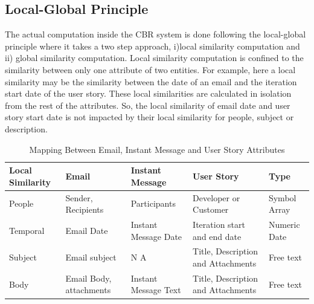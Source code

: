 \subsection{Local-Global Principle}

The actual computation inside the CBR system is done following the local-global principle\cite{local_global} where it takes a two step approach, i)local similarity computation and ii) global similarity computation. Local similarity computation is confined to the similarity between only one attribute of two entities. For example, here a local similarity may be the similarity between the date of an email and the iteration start date of the user story. These local similarities are calculated in isolation from the rest of the attributes. So, the local similarity of email date and user story start date is not impacted by their local similarity for people, subject or description.

\begin{table}[at]
  \centering

  \caption{Mapping Between Email, Instant Message and User Story Attributes}
	\label{tab:mapping}
    \begin{tabular}{|p{2.5cm}|p{3cm}|p{3cm}|p{4cm}|p{2cm}|}
      \hline
      \textbf{Local Similarity} & \textbf{Email} &  \textbf{Instant Message} & \textbf{User Story} & \textbf{Type} \\
      \hline
      People & Sender, Recipients & Participants & Developer or Customer & Symbol Array\\      
      \hline
      Temporal & Email Date & Instant Message Date & Iteration start and end date & Numeric Date \\
      \hline
      Subject & Email subject & N A & Title, Description and Attachments & Free text\\
      \hline
      Body & Email Body, attachments &  Instant Message Text  & Title, Description and Attachments &  Free text\\
      \hline
    \end{tabular}

\end{table}

